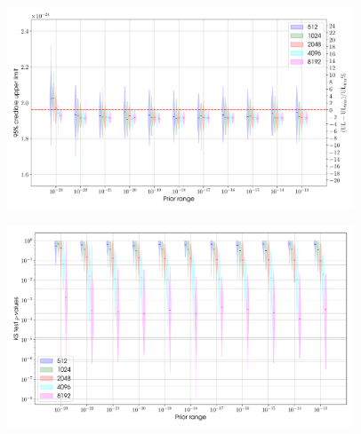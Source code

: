 \begin{figure}[phtb]
\begin{center}
\includegraphics[width=0.92\textwidth]{./figures/proptesting/walk_prop/upperlimits/collate_plots_wp_uls}
\caption{ \protect}
\end{center}
\end{figure}


\begin{figure}[phtb]
\begin{center}
\includegraphics[width=0.92\textwidth]{./figures/proptesting/walk_prop/kstest/collate_plots_wp_ks}
\caption{ \protect}
\end{center}
\end{figure}


